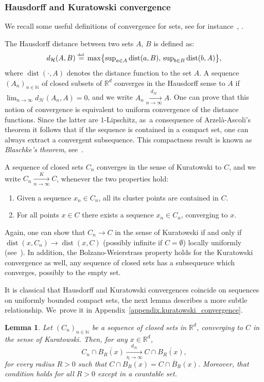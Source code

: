 \documentclass[JEP,XML,SOM,Unicode,NoFloatCountersInSection,published]{cedram}
\let\ts\textstyle
\newtheorem{lemma}[theorem]{Lemma}
\theoremstyle{definition}
\newcommand{\eqdef}{\ensuremath{\stackrel{\mbox{\upshape\tiny def.}}{=}}}
\newcommand{\RR}{\mathbb{R}}
\DeclareMathOperator{\dist}{dist}
\newcommand{\distH}{d_{\mathcal{H}}}
\begin{document}

\subsubsection{Hausdorff and Kuratowski convergence}\label{subsection.Hausdorff_Kuratoski}
We recall some useful definitions of convergence for sets, see for instance~\cite[Chap.\,4]{rockafellar2009variational}, \cite[Chap.\,6]{ambrosio2000functions}.

The Hausdorff distance between two sets $A$, $B$ is defined
as:
\begin{equation}
\label{hausdorff.distance}
\distH(A,B) \eqdef \max\bigl\{\ts
\sup_{a \in A} \dist(a, B),\, \sup_{b \in B} \dist(b, A)
\bigr\},
\end{equation}
where $\dist(\cdot, A)$ denotes the distance function to the set $A$.
A sequence $\left(A_n\right)_{n \in \mathbb{N}}$ of closed subsets of $\RR^d$ converges in the Hausdorff sense to $A$ if $\lim_{n\to\infty} \distH(A_n, A)=0$, and we write $A_n \xrightarrow[n \to \infty]{\distH} A$.
One can prove that this notion of convergence is equivalent to uniform convergence of the distance functions. Since the latter are $1$-Lipschitz, as~a consequence of Arzelà-Ascoli's theorem it follows that if the sequence is contained in a compact set, one can always extract a convergent subsequence. This compactness result is known as \emph{Blaschke's theorem}, see~\cite[Th.\,6.1]{ambrosio2000functions}.

A sequence of closed sets $C_n$ converges in the sense of Kuratowski to $C$, and we write $C_n \xrightarrow[n \to \infty]{K} C$, whenever the two properties hold:
\begin{enumerate}
\item Given a sequence $x_n \in C_n$, all its cluster points are contained in $C$.
\item For all points $x\in C$ there exists a sequence $x_n \in C_n$, converging to $x$.
\end{enumerate}
Again, one can show that $C_n\to C$ in the sense of Kuratowski
if and only if $\dist(x,C_n)\to\dist(x,C)$ (possibly infinite if $C=\emptyset$) locally uniformly (see~\cite[Cor.\,4.7]{rockafellar2009variational}). In addition, the Bolzano-Weierstrass property holds for the Kuratowski convergence as well, \ie any sequence of closed sets has a subsequence which converges, possibly to the empty set.

It is classical that Hausdorff and Kuratowski convergences coincide on sequences on uniformly bounded compact sets, the next lemma describes a more subtle relationship. We~prove it in Appendix~\ref{appendix.kuratowski_convergence}.
\begin{lemma}\label{lemma.localized_Kuratowski}
Let $(C_n)_{n \in \mathbb{N}}$ be a sequence of closed sets in $\RR^d$, converging to $C$ in the sense of Kuratowski.
Then, for any $x \in \RR^d$,
\[
C_n\cap\overline{B_R(x)}
\xrightarrow[n \to \infty]{\distH}
C\cap\overline{B_R(x)},
\]
for every radius $R>0$ such that $\overline{C\cap B_R(x)} = C\cap \overline{B}_R(x)$. Moreover, that condition holds for all $R>0$ except in a countable set.
\end{lemma}
\end{document}
